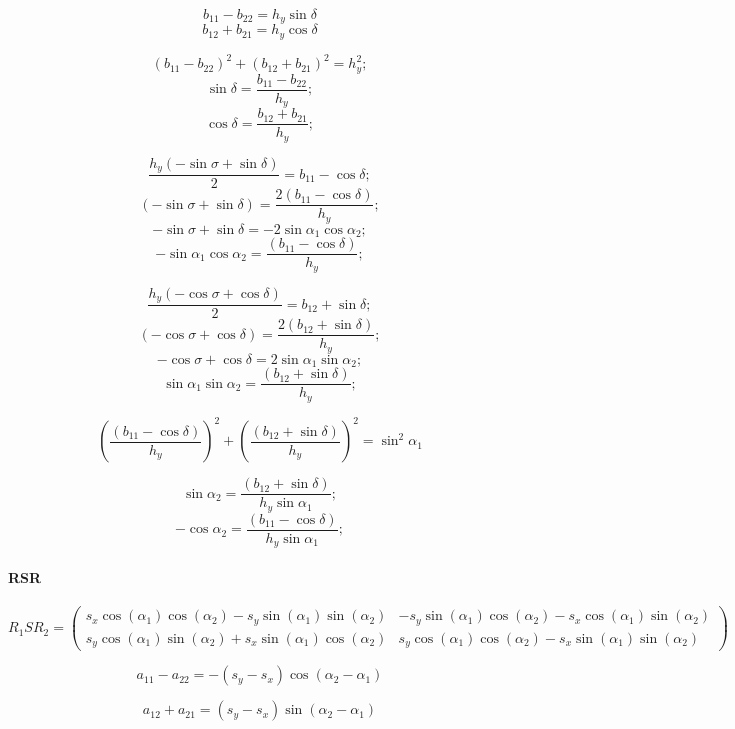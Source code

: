 $$b_{11} - b_{22} = {h_y}\sin\delta  $$
$$b_{12} + b_{21} = {h_y}\cos\delta  $$

$$\left(b_{11} - b_{22}\right)^2 + \left(b_{12} + b_{21}\right)^2 = h_y^2;$$
$$\sin\delta = \frac{b_{11} - b_{22}}{h_y};$$
$$\cos\delta = \frac{b_{12} + b_{21}}{h_y};$$

$$\frac{{h_y} (-\sin\sigma + \sin\delta)}{2} = b_{11} - \cos\delta;$$
$$(-\sin\sigma + \sin\delta) = \frac{2(b_{11} - \cos\delta)}{h_y};$$
$$-\sin\sigma + \sin\delta = -2\sin\alpha_1 \cos\alpha_2;$$
$$-\sin\alpha_1 \cos\alpha_2 = \frac{(b_{11} - \cos\delta)}{h_y};$$

$$\frac{{h_y} (-\cos\sigma + \cos\delta)}{2} = b_{12} + \sin\delta;$$
$$(-\cos\sigma + \cos\delta) = \frac{2(b_{12} + \sin\delta)}{h_y};$$
$$-\cos\sigma + \cos\delta =  2\sin\alpha_1 \sin\alpha_2;$$
$$ \sin\alpha_1 \sin\alpha_2 = \frac{(b_{12} + \sin\delta)}{h_y};$$

$$
\left( \frac{(b_{11} - \cos\delta)}{h_y} \right)^2
+
\left( \frac{(b_{12} + \sin\delta)}{h_y} \right)^2
= \sin^2 \alpha_1
$$

$$ \sin\alpha_2 = \frac{(b_{12} + \sin\delta)}{h_y \sin\alpha_1};$$
$$-\cos\alpha_2 = \frac{(b_{11} - \cos\delta)}{h_y \sin\alpha_1};$$


\paragraph{RSR}

$$R_1SR_2 = 
\begin{pmatrix}
 {s_x}\cos{\left( {\alpha_1}\right) } \cos{\left( {\alpha_2}\right) } - {s_y}\sin{\left( {\alpha_1}\right) } \sin{\left( {\alpha_2}\right) }  & 
-{s_y}\sin{\left( {\alpha_1}\right) } \cos{\left( {\alpha_2}\right) } - {s_x}\cos{\left( {\alpha_1}\right) } \sin{\left( {\alpha_2}\right) } \\
 {s_y}\cos{\left( {\alpha_1}\right) } \sin{\left( {\alpha_2}\right) } + {s_x}\sin{\left( {\alpha_1}\right) } \cos{\left( {\alpha_2}\right) }  & 
 {s_y}\cos{\left( {\alpha_1}\right) } \cos{\left( {\alpha_2}\right) } - {s_x}\sin{\left( {\alpha_1}\right) } \sin{\left( {\alpha_2}\right) } 
\end{pmatrix}
$$



$$a_{11} - a_{22} = - \left( {s_y}-{s_x}\right) \cos{\left( {\alpha_2}-{\alpha_1}\right) } $$

$$a_{12} + a_{21} = \left( {s_y}-{s_x}\right) \sin{\left( {\alpha_2}-{\alpha_1}\right) } $$

